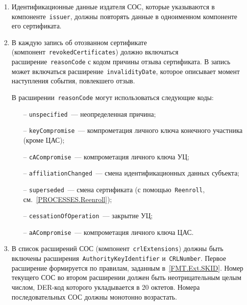 \begin{enumerate}
\item
Идентификационные данные издателя СОС, которые указываются в 
компоненте~\texttt{issuer}, должны повторять данные в одноименном 
компоненте его сертификата. 

\item
В каждую запись об отозванном сертификате 
(компонент~\texttt{revokedCertificates}) должно включаться 
расширение~\texttt{reasonCode} с кодом причины отзыва сертификата. 
%
В запись может включаться расширение~\texttt{invalidityDate}, которое 
описывает момент наступления события, повлекшего отзыв.

В расширении~\texttt{reasonCode} могут использоваться следующие коды:
\begin{itemize}
\item[--]
\texttt{unspecified}~--- неопределенная причина;
\item[--]
\texttt{keyCompromise}~--- компрометация личного ключа конечного участника 
(кроме ЦАС); 
\item[--]
\texttt{cACompromise}~--- компрометация личного ключа УЦ;
\item[--]
\texttt{affiliationChanged}~--- смена идентификационных данных субъекта;
\item[--]
\texttt{superseded}~--- смена сертификата (с помощью~\texttt{Reenroll}, 
см.~\ref{PROCESSES.Reenroll}); 
\item[--]
\texttt{cessationOfOperation}~--- закрытие УЦ;
\item[--]
\texttt{aACompromise}~--- компрометация личного ключа ЦАС.
\end{itemize}

\item
В список расширений СОС (компонент~\texttt{crlExtensions})
должны быть включены расширения~\texttt{AuthorityKeyIdentifier} 
и~\texttt{CRLNumber}. Первое расширение формируется по правилам,
заданным в~\ref{FMT.Ext.SKID}. Номер текущего СОС во втором расширении
должен быть неотрицательным целым числом, DER-код которого укладывается в 
20 октетов. Номера последовательных СОС должны монотонно возрастать.
\end{enumerate}
